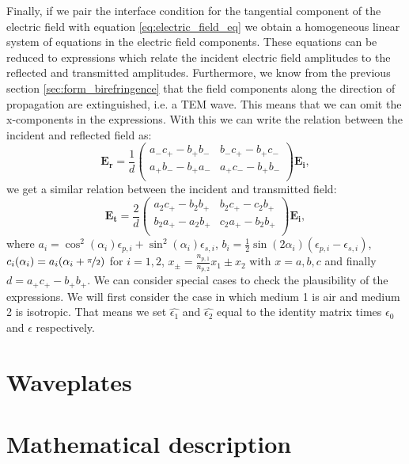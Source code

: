 Finally, if we pair the interface condition for the tangential component of the electric field with equation \ref{eq:electric_field_eq} we obtain a homogeneous linear system of equations in the electric field components. These equations can be reduced to expressions which relate the incident electric field amplitudes to the reflected and transmitted amplitudes. Furthermore, we know from the previous section \ref{sec:form_birefringence} that the field components along the direction of propagation are extinguished, i.e. a TEM wave. This means that we can omit the x-components in the expressions. With this we can write the relation between the incident and reflected field as:
\begin{equation}
    \bm{E_r} =
    \frac{1}{d}
    \begin{pmatrix}
        a_-c_+ - b_+b_- & b_-c_+ - b_+c_- \\
        a_+b_- - b_+a_- & a_+c_- - b_+b_- \\
    \end{pmatrix}
    \bm{E_i},
\end{equation}
we get a similar relation between the incident and transmitted field:
\begin{equation}
    \bm{E_t} =
    \frac{2}{d}
    \begin{pmatrix}
        a_2c_+ - b_2b_+ & b_2c_+ - c_2b_+ \\
        b_2a_+ - a_2b_+ & c_2a_+ - b_2b_+ \\
    \end{pmatrix}
    \bm{E_i},
\end{equation}
where $a_i=\cos^2(\alpha_i)\epsilon_{p,i}+\sin^2(\alpha_i)\epsilon_{s,i}$, $b_i=\frac{1}{2}\sin(2\alpha_i)(\epsilon_{p,i}-\epsilon_{s,i})$, $c_i(\alpha_i) = a_i(\alpha_i + \nicefrac{\pi}{2})$ for $i=1,2$, $x_{\pm}=\frac{n_{p,1}}{n_{p,2}}x_1\pm x_2$ with $x=a,b,c$ and finally $d=a_+c_+-b_+b_+$. We can consider special cases to check the plausibility of the expressions. We will first consider the case in which medium 1 is air and medium 2 is isotropic. That means we set $\hat{\epsilon_1}$ and $\hat{\epsilon_2}$ equal to the identity matrix times $\epsilon_0$ and $\epsilon$ respectively. 


\section{Waveplates}
\label{sec:waveplates}

\section{Mathematical description}
\label{sec:mathdescription}

